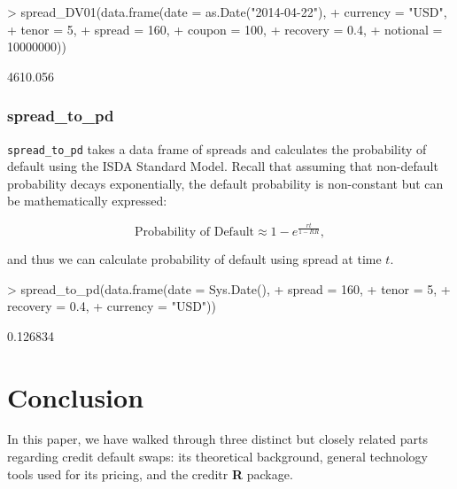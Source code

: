 \documentclass{jss}
\renewenvironment{Schunk}{\vspace{\topsep}}{\vspace{\topsep}}
\begin{document}
\begin{Schunk}
\begin{Sinput}
> spread_DV01(data.frame(date     = as.Date("2014-04-22"),
+                        currency = "USD",
+                        tenor    = 5,
+                        spread   = 160,
+                        coupon   = 100,
+                        recovery = 0.4,
+                        notional = 10000000))
\end{Sinput}
\begin{Soutput}
[1] 4610.056
\end{Soutput}
\end{Schunk}


\subsubsection{spread\_to\_pd}

\texttt{spread\_to\_pd} takes a data frame of spreads and calculates the probability of default using the ISDA Standard Model. Recall that assuming that non-default probability decays exponentially, the default probability is non-constant but can be mathematically expressed:
 
\begin{equation}
  \text{Probability of Default} \approx 1 - e ^ {\frac{rt}{1-RR}}, \nonumber
\end{equation}

and thus we can calculate probability of default using spread at time $t$.

\begin{Schunk}
\begin{Sinput}
> spread_to_pd(data.frame(date     = Sys.Date(),
+                         spread   = 160,
+                         tenor    = 5,
+                         recovery = 0.4,
+                         currency = "USD"))
\end{Sinput}
\begin{Soutput}
[1] 0.126834
\end{Soutput}
\end{Schunk}

\section{Conclusion}


In this paper, we have walked through three distinct but closely related parts regarding credit default swaps: its theoretical background, general technology tools used for its pricing, and the creditr \textbf{R} package.
\end{document}
